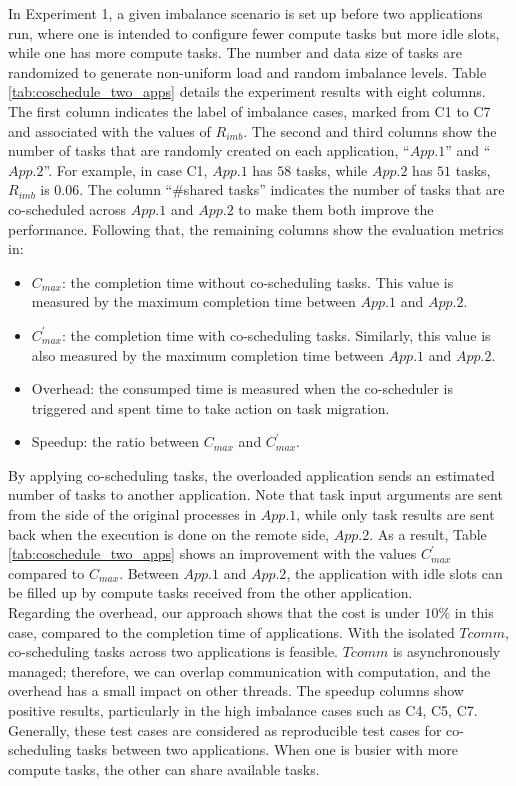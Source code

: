 In Experiment 1, a given imbalance scenario is set up before two applications run, where one is intended to configure fewer compute tasks but more idle slots, while one has more compute tasks. The number and data size of tasks are randomized to generate non-uniform load and random imbalance levels. Table \ref{tab:coschedule_two_apps} details the experiment results with eight columns. The first column indicates the label of imbalance cases, marked from C1 to C7 and associated with the values of $R_{imb}$. The second and third columns show the number of tasks that are randomly created on each application, ``$App.1$'' and ``$App.2$''. For example, in case C1, $App.1$ has $58$ tasks, while $App.2$ has $51$ tasks, $R_{imb}$ is $0.06$. The column ``\#shared tasks'' indicates the number of tasks that are co-scheduled across $App.1$ and $App.2$ to make them both improve the performance. Following that, the remaining columns show the evaluation metrics in:
\begin{itemize}
	\item $C_{max}$: the completion time without co-scheduling tasks. This value is measured by the maximum completion time between $App.1$ and $App.2$.
	\item $C^{'}_{max}$: the completion time with co-scheduling tasks. Similarly, this value is also measured by the maximum completion time between $App.1$ and $App.2$.
	\item Overhead: the consumped time is measured when the co-scheduler is triggered and spent time to take action on task migration.
	\item Speedup: the ratio between $C_{max}$ and $C^{'}_{max}$.
\end{itemize}

By applying co-scheduling tasks, the overloaded application sends an estimated number of tasks to another application. Note that task input arguments are sent from the side of the original processes in $App.1$, while only task results are sent back when the execution is done on the remote side, $App.2$. As a result, Table \ref{tab:coschedule_two_apps} shows an improvement with the values $C^{'}_{max}$ compared to $C_{max}$. Between $App.1$ and $App.2$, the application with idle slots can be filled up by compute tasks received from the other application.\\

Regarding the overhead, our approach shows that the cost is under $10\%$ in this case, compared to the completion time of applications. With the isolated $Tcomm$, co-scheduling tasks across two applications is feasible. $Tcomm$ is asynchronously managed; therefore, we can overlap communication with computation, and the overhead has a small impact on other threads. The speedup columns show positive results, particularly in the high imbalance cases such as C4, C5, C7. Generally, these test cases are considered as reproducible test cases for co-scheduling tasks between two applications. When one is busier with more compute tasks, the other can share available tasks.\\


